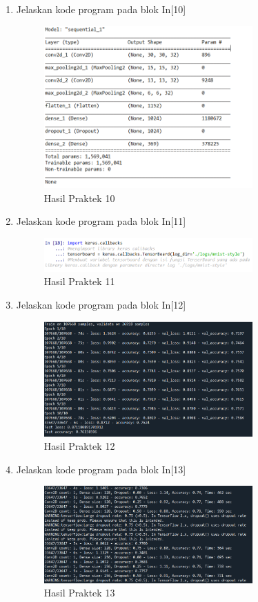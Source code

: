 \begin{enumerate}
\item Jelaskan kode program pada blok In[10]
	
\begin{figure}[H]
    \includegraphics[width=8cm]{figures/1174084/7/10.png}
    \centering
    \caption{Hasil Praktek 10}
\end{figure}

\item Jelaskan kode program pada blok  In[11]
		
\begin{figure}[H]
    \includegraphics[width=8cm]{figures/1174084/7/11.png}
    \centering
    \caption{Hasil Praktek 11}
\end{figure}

\item Jelaskan kode program pada blok In[12]
	
\begin{figure}[H]
    \includegraphics[width=8cm]{figures/1174084/7/12.png}
    \centering
    \caption{Hasil Praktek 12}
\end{figure}


\item Jelaskan kode program pada blok In[13]
	
\begin{figure}[H]
    \includegraphics[width=8cm]{figures/1174084/7/13.png}
    \centering
    \caption{Hasil Praktek 13}
\end{figure}



\end{enumerate}
